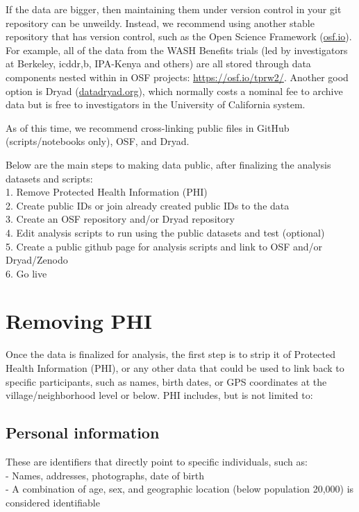 \documentclass[
]{book}
\begin{document}
If the data are bigger, then maintaining them under version control in your git repository can be unweildy. Instead, we recommend using another stable repository that has version control, such as the Open Science Framework (\href{https://osf.io}{osf.io}). For example, all of the data from the WASH Benefits trials (led by investigators at Berkeley, icddr,b, IPA-Kenya and others) are all stored through data components nested within in OSF projects: \url{https://osf.io/tprw2/}. Another good option is Dryad (\href{https://datadryad.org/}{datadryad.org}), which normally costs a nominal fee to archive data but is free to investigators in the University of California system.

As of this time, we recommend cross-linking public files in GitHub (scripts/notebooks only), OSF, and Dryad.

Below are the main steps to making data public, after finalizing the analysis datasets and scripts:\\
1. Remove Protected Health Information (PHI)\\
2. Create public IDs or join already created public IDs to the data\\
3. Create an OSF repository and/or Dryad repository\\
4. Edit analysis scripts to run using the public datasets and test (optional)\\
5. Create a public github page for analysis scripts and link to OSF and/or Dryad/Zenodo\\
6. Go live

\section{Removing PHI}\label{removing-phi}

Once the data is finalized for analysis, the first step is to strip it of Protected Health Information (PHI), or any other data that could be used to link back to specific participants, such as names, birth dates, or GPS coordinates at the village/neighborhood level or below. PHI includes, but is not limited to:

\subsection{Personal information}\label{personal-information}

These are identifiers that directly point to specific individuals, such as:\\
- Names, addresses, photographs, date of birth\\
- A combination of age, sex, and geographic location (below population 20,000) is considered identifiable
\end{document}
